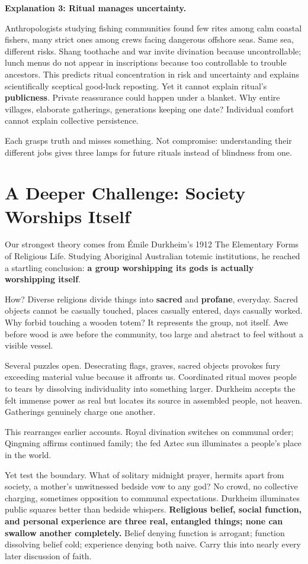 \textbf{Explanation 3: Ritual manages uncertainty.}

Anthropologists studying fishing communities found few rites among calm coastal fishers, many strict ones among crews facing dangerous offshore seas. Same sea, different risks. Shang toothache and war invite divination because uncontrollable; lunch menus do not appear in inscriptions because too controllable to trouble ancestors. This predicts ritual concentration in risk and uncertainty and explains scientifically sceptical good-luck reposting. Yet it cannot explain ritual's \textbf{publicness}. Private reassurance could happen under a blanket. Why entire villages, elaborate gatherings, generations keeping one date? Individual comfort cannot explain collective persistence.

Each grasps truth and misses something. Not compromise: understanding their different jobs gives three lamps for future rituals instead of blindness from one.

\section[Further Challenge: Society Worships Itself]{A Deeper Challenge: Society Worships Itself}
Our strongest theory comes from Émile Durkheim's 1912 The Elementary Forms of Religious Life. Studying Aboriginal Australian totemic institutions, he reached a startling conclusion: \textbf{a group worshipping its gods is actually worshipping itself}.

How? Diverse religions divide things into \textbf{sacred} and \textbf{profane}, everyday. Sacred objects cannot be casually touched, places casually entered, days casually worked. Why forbid touching a wooden totem? It represents the group, not itself. Awe before wood is awe before the community, too large and abstract to feel without a visible vessel.

Several puzzles open. Desecrating flags, graves, sacred objects provokes fury exceeding material value because it affronts us. Coordinated ritual moves people to tears by dissolving individuality into something larger. Durkheim accepts the felt immense power as real but locates its source in assembled people, not heaven. Gatherings genuinely charge one another.

This rearranges earlier accounts. Royal divination switches on communal order; Qingming affirms continued family; the fed Aztec sun illuminates a people's place in the world.

Yet test the boundary. What of solitary midnight prayer, hermits apart from society, a mother's unwitnessed bedside vow to any god? No crowd, no collective charging, sometimes opposition to communal expectations. Durkheim illuminates public squares better than bedside whispers. \textbf{Religious belief, social function, and personal experience are three real, entangled things; none can swallow another completely.} Belief denying function is arrogant; function dissolving belief cold; experience denying both naive. Carry this into nearly every later discussion of faith.

